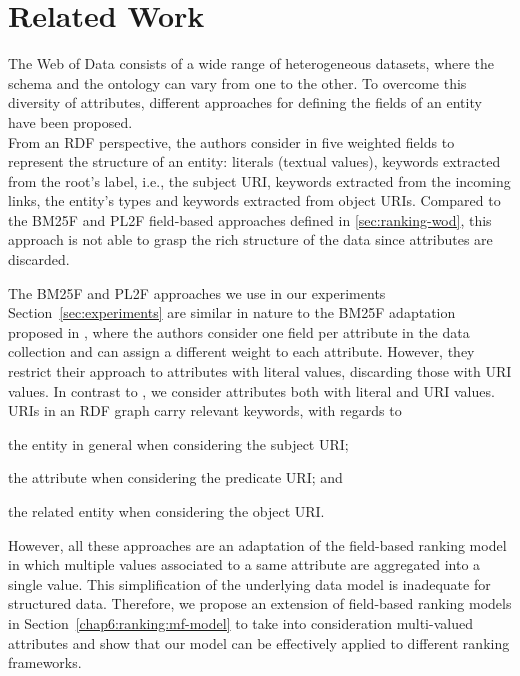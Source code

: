 \section{Related Work}
\label{sec:searching:relwork}

The Web of Data consists of a wide range of heterogeneous datasets, where the schema and the ontology can vary from one to the other. To overcome this diversity of attributes, different approaches for defining the \glspl{field} of an entity have been proposed.\\

From an RDF perspective, the authors consider in \cite{Perez-Aguera:2010:UBS} five weighted fields to represent the structure of an entity: literals (textual values), keywords extracted from the root's label, i.e., the subject URI, keywords extracted from the incoming links, the entity's \gls{types} and keywords extracted from object URIs. Compared to the BM25F and PL2F field-based approaches defined in \ref{sec:ranking-wod}, this approach is not able to grasp the rich structure of the data since attributes are discarded.

The BM25F and PL2F approaches we use in our experiments Section~\ref{sec:experiments} are similar in nature to the BM25F adaptation proposed in \cite{blanco:2011:iswc}, where the authors consider one field per attribute in the data collection and can assign a different weight to each attribute. However, they restrict their approach to attributes with literal values, discarding those with URI values. In contrast to \cite{blanco:2011:iswc}, we consider attributes both with literal and URI values. URIs in an RDF graph carry relevant keywords, with regards to
\begin{inparaenum}[(1)]
	\item the entity in general when considering the subject URI;
	\item the attribute when considering the predicate URI; and
	\item the related entity when considering the object URI.\\
\end{inparaenum}

However, all these approaches are an adaptation of the field-based ranking model in which multiple values associated to a same attribute are aggregated into a single value. This simplification of the underlying data model is inadequate for structured data. Therefore, we propose an extension of field-based ranking models in Section~\ref{chap6:ranking:mf-model} to take into consideration multi-valued attributes and show that our model can be effectively applied to different ranking frameworks.


